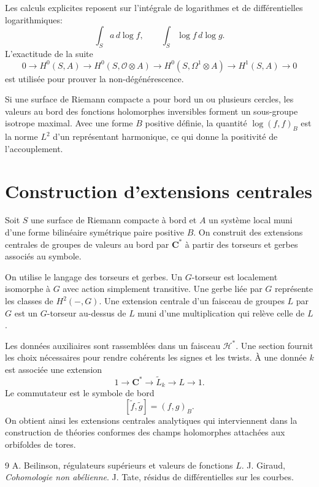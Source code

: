 \documentclass[11pt]{article}
\newcommand{\C}{\mathbf C}
\newcommand{\OO}{\mathcal O}
\begin{document}
Les calculs explicites reposent sur l'intégrale de logarithmes et de différentielles logarithmiques:
\begin{equation}\tag{4.6.1}
 \int_S a\,d\log f,
\qquad
 \int_S \log f\,d\log g.
\end{equation}
L'exactitude de la suite
\begin{equation}\tag{4.7.1}
 0\to H^0(S,A)\to H^0(S,\OO\otimes A)\to H^0(S,\Omega^1\otimes A)\to H^1(S,A)\to0
\end{equation}
est utilisée pour prouver la non-dégénérescence.

Si une surface de Riemann compacte a pour bord un ou plusieurs cercles, les valeurs au bord des fonctions holomorphes inversibles forment un sous-groupe isotrope maximal. Avec une forme $B$ positive définie, la quantité $\log(f,f)_B$ est la norme $L^2$ d'un représentant harmonique, ce qui donne la positivité de l'accouplement.

\section{Construction d'extensions centrales}

Soit $S$ une surface de Riemann compacte à bord et $A$ un système local muni d'une forme bilinéaire symétrique paire positive $B$. On construit des extensions centrales de groupes de valeurs au bord par $\C^*$ à partir des torseurs et gerbes associés au symbole.

On utilise le langage des torseurs et gerbes. Un $G$-torseur est localement isomorphe à $G$ avec action simplement transitive. Une gerbe liée par $G$ représente les classes de $H^2(-,G)$. Une extension centrale d'un faisceau de groupes $L$ par $G$ est un $G$-torseur au-dessus de $L$ muni d'une multiplication qui relève celle de $L$.

Les données auxiliaires sont rassemblées dans un faisceau $\mathcal H^*$. Une section fournit les choix nécessaires pour rendre cohérents les signes et les twists. À une donnée $k$ est associée une extension
\begin{equation}\tag{5.12.1}
 1\longrightarrow\C^*\longrightarrow\widetilde L_k\longrightarrow L\longrightarrow1.
\end{equation}
Le commutateur est le symbole de bord
\begin{equation}\tag{5.16.1}
 [\tilde f,\tilde g]=(f,g)_B.
\end{equation}
On obtient ainsi les extensions centrales analytiques qui interviennent dans la construction de théories conformes des champs holomorphes attachées aux orbifoldes de tores.

\begin{thebibliography}{9}
 A. Beilinson, régulateurs supérieurs et valeurs de fonctions $L$.
 J. Giraud, \emph{Cohomologie non abélienne}.
 J. Tate, résidus de différentielles sur les courbes.
\end{thebibliography}
\end{document}
